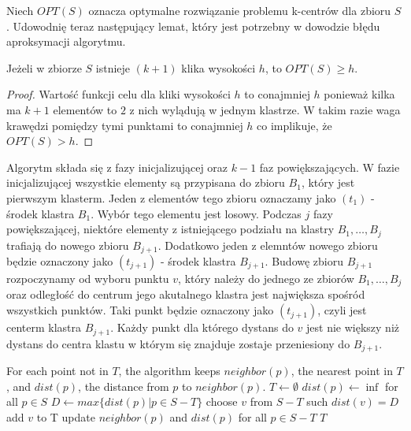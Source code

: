 \noindent
Niech $OPT(S)$ oznacza optymalne rozwiązanie problemu k-centrów dla zbioru $S$.
Udowodnię teraz następujący lemat, który jest potrzebny w dowodzie błędu aproksymacji algorytmu.

\begin{lemma}
    Jeżeli w zbiorze $S$ istnieje $(k+1)$ klika wysokości $h$, to $OPT(S) \geq h$.
\end{lemma}

\begin{proof}
    Wartość funkcji celu dla kliki wysokości $h$ to conajmniej $h$ ponieważ kilka ma $k+1$ elementów to $2$ z nich wylądują w jednym klastrze.
    W takim razie waga krawędzi pomiędzy tymi punktami to conajmniej $h$ co implikuje, że $OPT(S) > h$.
\end{proof}

\noindent
Algorytm składa się z fazy inicjalizującej oraz $k-1$ faz powiększających.
W fazie inicjalizującej wszystkie elementy są przypisana do zbioru $B_{1}$, który jest pierwszym klasterm.
Jeden z elementów tego zbioru oznaczamy jako $(t_{1})$ - środek klastra $B_{1}$.
Wybór tego elementu jest losowy.
Podczas $j$ fazy powiększającej, niektóre elementy z istniejącego podziału na klastry $B_{1}, \dots, B_{j}$ trafiają do nowego zbioru $B_{j+1}$.
Dodatkowo jeden z elemntów nowego zbioru będzie oznaczony jako $(t_{j+1})$ - środek klastra $B_{j+1}$.
Budowę zbioru $B_{j+1}$ rozpoczynamy od wyboru punktu $v$, który należy do jednego ze zbiorów $B_{1}, \dots, B_{j}$ oraz odległość do centrum jego akutalnego klastra jest największa spośród wszystkich punktów. 
Taki punkt będzie oznaczony jako $(t_{j+1})$, czyli jest centerm klastra $B_{j+1}$.
Każdy punkt dla którego dystans do $v$ jest nie większy niż dystans do centra klastu w którym się znajduje zostaje przeniesiony do $B_{j+1}$.
\begin{algorithm}
    \caption{}
\begin{algorithmic}
    \State For each point not in $T$, the algorithm keeps $neighbor(p)$, the nearest point in $T$, and $dist(p)$, the distance from $p$ to $neighbor(p)$.
        \State $T \leftarrow \emptyset$
        \State $dist(p) \leftarrow \inf$ for all $p \in S$
            \State $D \leftarrow max\{dist(p) | p \in S-T\}$
            \State choose $v$ from $S-T$ such $dist(v) = D$
            \State add $v$ to T
            \State update $neighbor(p)$ and $dist(p)$ for all $p \in S-T$
        \EndWhile
    \EndProcedure
    \Return $T$
\end{algorithmic}
\end{algorithm}
